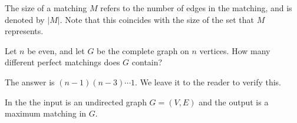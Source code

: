\begin{note}
\label{note:Size-of-a-matching}
The size of a matching $M$ refers to the number of edges in the matching, and is denoted by $|M|$. Note that this coincides with the size of the set that $M$ represents.

\end{note}

\begin{flex}
\label{grp:exercise:Number-of-perfect-matchings-in-a-complete-graph}

\begin{exercise}
\label{exercise:Number-of-perfect-matchings-in-a-complete-graph}
Let $n$ be even, and let $G$ be the complete graph on $n$ vertices. How many different perfect matchings does $G$ contain?

\end{exercise}

\begin{solution}
\label{sol:matchings-in-graphs::answer}
The answer is $(n-1)(n-3) \cdots 1$. We leave it to the reader to verify this.

\end{solution}
\end{flex}

\begin{definition}
\label{definition:Maximum-matching-problem}
In the  the input is an undirected graph $G=(V,E)$ and the output is a maximum matching in $G$.

\end{definition}

